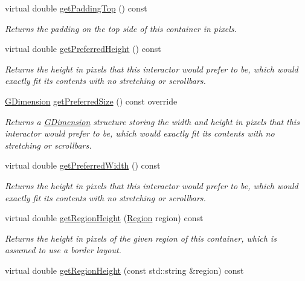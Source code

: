 \begin{DoxyCompactItemize}
virtual double \mbox{\hyperlink{classGContainer_ada97c35b2f3366886a49d63fff9d7bd4}{get\+Padding\+Top}} () const
\begin{DoxyCompactList}\small\item\em Returns the padding on the top side of this container in pixels. \end{DoxyCompactList}\item 
virtual double \mbox{\hyperlink{classGInteractor_a747de0961653847bdc6615dbf756d715}{get\+Preferred\+Height}} () const
\begin{DoxyCompactList}\small\item\em Returns the height in pixels that this interactor would prefer to be, which would exactly fit its contents with no stretching or scrollbars. \end{DoxyCompactList}\item 
\mbox{\hyperlink{structGDimension}{G\+Dimension}} \mbox{\hyperlink{classGContainer_ac0fd6fc35681f935c67ad68078b354b8}{get\+Preferred\+Size}} () const override
\begin{DoxyCompactList}\small\item\em Returns a \mbox{\hyperlink{structGDimension}{G\+Dimension}} structure storing the width and height in pixels that this interactor would prefer to be, which would exactly fit its contents with no stretching or scrollbars. \end{DoxyCompactList}\item 
virtual double \mbox{\hyperlink{classGInteractor_a82bca31d37700fb0e35d2743352efd5e}{get\+Preferred\+Width}} () const
\begin{DoxyCompactList}\small\item\em Returns the height in pixels that this interactor would prefer to be, which would exactly fit its contents with no stretching or scrollbars. \end{DoxyCompactList}\item 
virtual double \mbox{\hyperlink{classGContainer_a164d248057318961e7f2abc8c3477d63}{get\+Region\+Height}} (\mbox{\hyperlink{classGContainer_a81a01a86de31071a92e6cce0bab9bc4b}{Region}} region) const
\begin{DoxyCompactList}\small\item\em Returns the height in pixels of the given region of this container, which is assumed to use a border layout. \end{DoxyCompactList}\item 
virtual double \mbox{\hyperlink{classGContainer_ae8a545e772745b89edaf9804a2dc0057}{get\+Region\+Height}} (const std\+::string \&region) const

\end{DoxyCompactItemize}
